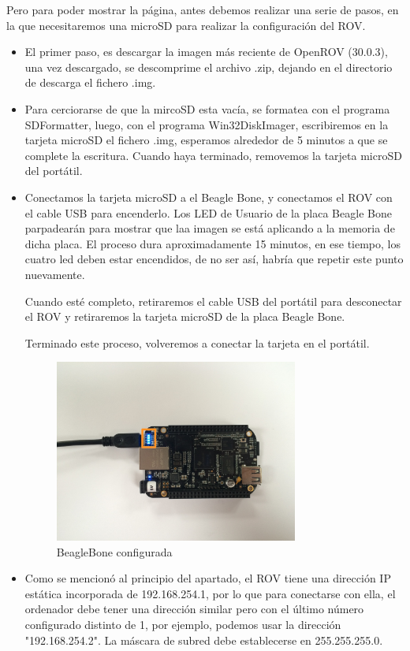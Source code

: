 Pero para poder mostrar la página, antes debemos realizar una serie de pasos, en la que necesitaremos una microSD para realizar la configuración del ROV.
  
\begin{itemize}
\item El primer paso, es descargar la imagen más reciente de OpenROV (30.0.3), una vez descargado, se descomprime el archivo .zip, dejando en el directorio de descarga el fichero .img.
\item Para cerciorarse de que la mircoSD esta vacía, se formatea con el programa SDFormatter, luego, con el programa Win32DiskImager, escribiremos en la tarjeta microSD el fichero .img, esperamos alrededor de 5 minutos a que se complete la escritura. Cuando haya terminado, removemos la tarjeta microSD del portátil.
\item Conectamos  la tarjeta microSD a el Beagle Bone, y conectamos el ROV con el cable USB para encenderlo. Los LED de Usuario de la placa Beagle Bone parpadearán para mostrar que laa imagen se está aplicando a la memoria de dicha placa. El proceso dura aproximadamente 15 minutos, en ese tiempo, los cuatro led deben estar encendidos, de no ser así, habría que repetir este punto nuevamente.

Cuando esté completo, retiraremos el cable USB del portátil para desconectar el ROV y retiraremos la tarjeta microSD de la placa Beagle Bone.

Terminado este proceso, volveremos a conectar la tarjeta en el portátil.

\begin{figure} [hbtp]
\begin{center}
  \includegraphics[width=8cm]{img/cap3/3_4/BBB}
\end{center}
\caption{BeagleBone configurada}
\label{fig:bbb}
\end{figure}
\item Como se mencionó al principio del apartado, el ROV tiene una dirección IP estática incorporada de 192.168.254.1, por lo que para conectarse con ella, el ordenador debe tener una dirección similar pero con el último número configurado  distinto de 1, por ejemplo, podemos usar la dirección "192.168.254.2". La máscara de subred debe establecerse en 255.255.255.0.


\end{itemize}
